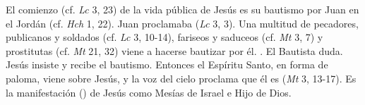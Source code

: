  El comienzo (cf. \emph{Lc} 3, 23) de la vida pública de Jesús es su bautismo por Juan en el Jordán (cf. \emph{Hch} 1, 22). Juan proclamaba  (\emph{Lc} 3, 3). Una multitud de pecadores, publicanos y soldados (cf. \emph{Lc} 3, 10-14), fariseos y saduceos (cf. \emph{Mt} 3, 7) y prostitutas (cf. \emph{Mt} 21, 32) viene a hacerse bautizar por él. . El Bautista duda. Jesús insiste y recibe el bautismo. Entonces el Espíritu Santo, en forma de paloma, viene sobre Jesús, y la voz del cielo proclama que él es  (\emph{Mt} 3, 13-17). Es la manifestación () de Jesús como Mesías de Israel e Hijo de Dios.